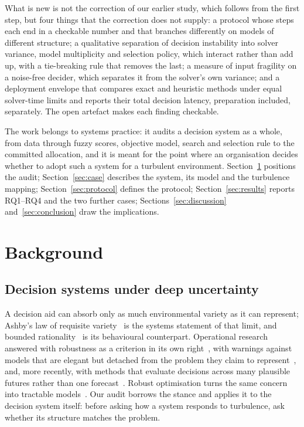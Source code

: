 \documentclass[systems,article,submit,moreauthors,pdftex]{Definitions/mdpi}
\begin{document}
What is new is not the correction of our earlier study, which follows from the first step, but
four things that the correction does not supply: a protocol whose steps each end in a
checkable number and that branches differently on models of different structure; a
qualitative separation of decision instability into solver variance, model multiplicity and
selection policy, which interact rather than add up, with a tie-breaking rule that removes the
last; a measure of input fragility on a
noise-free decider, which separates it from the solver's own variance; and a deployment
envelope that compares exact and heuristic methods under equal solver-time limits and reports
their total decision latency, preparation included, separately. The open
artefact makes each finding checkable.

The work belongs to systems practice: it audits a decision system as a whole, from data
through fuzzy scores, objective model, search and selection rule to the committed allocation,
and it is meant for the point where an organisation decides whether to adopt such a system
for a turbulent environment. Section~\ref{sec:background} positions the audit;
Section~\ref{sec:case} describes the system, its model and the turbulence mapping;
Section~\ref{sec:protocol} defines the protocol; Section~\ref{sec:results} reports RQ1--RQ4
and the two further cases; Sections~\ref{sec:discussion} and~\ref{sec:conclusion} draw the
implications.

\section{Background}\label{sec:background}

\subsection{Decision systems under deep uncertainty}
A decision aid can absorb only as much environmental variety as it can represent; Ashby's
law of requisite variety~\cite{ashby1956cybernetics} is the systems statement of that
limit, and bounded rationality~\cite{simon1955behavioral} is its behavioural counterpart.
Operational research answered with robustness as a criterion in its own
right~\cite{rosenhead1972robustness}, with warnings against models that are elegant but
detached from the problem they claim to represent~\cite{ackoff1979future}, and, more
recently, with methods that evaluate decisions across many plausible futures rather than
one forecast~\cite{lempert2006robust,walker2003uncertainty,marchau2019deep}. Robust
optimisation turns the same concern into tractable models~\cite{bental2002robust,bertsimas2004price}.
Our audit borrows the stance and applies it to the decision system itself: before asking
how a system responds to turbulence, ask whether its structure matches the problem.
\end{document}
